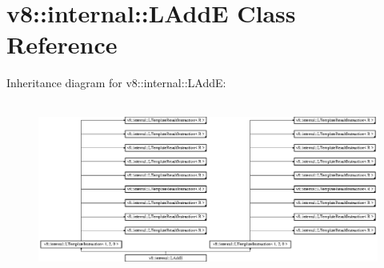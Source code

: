 \hypertarget{classv8_1_1internal_1_1_l_add_e}{}\section{v8\+:\+:internal\+:\+:L\+AddE Class Reference}
\label{classv8_1_1internal_1_1_l_add_e}
Inheritance diagram for v8\+:\+:internal\+:\+:L\+AddE\+:\begin{figure}[H]
\begin{center}
\leavevmode
\includegraphics[height=5.724907cm]{classv8_1_1internal_1_1_l_add_e}
\end{center}
\end{figure}
